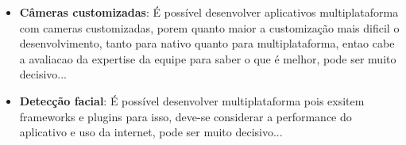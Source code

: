 \begin{itemize}
	\item \textbf{Câmeras customizadas}: É possível desenvolver aplicativos multiplataforma com cameras customizadas, porem quanto maior a customização mais dificil o desenvolvimento, tanto para nativo quanto para 
	multiplataforma, entao cabe a avaliacao da expertise da equipe para saber o que é melhor, pode ser muito decisivo...
	\item \textbf{Detecção facial}: É possível desenvolver multiplataforma pois exsitem frameworks e plugins para isso, deve-se considerar a performance do aplicativo e uso da internet, pode ser muito decisivo...
\end{itemize}